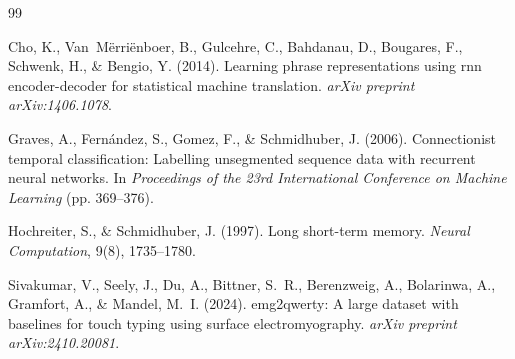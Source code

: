 \documentclass{article}
\begin{document}
{
\small


\begin{thebibliography}{99}

Cho, K., Van~M{\"e}rri{\"e}nboer, B., Gulcehre, C., Bahdanau, D., Bougares, F., Schwenk, H., \& Bengio, Y. (2014).
\newblock Learning phrase representations using rnn encoder-decoder for statistical machine translation.
\newblock \emph{arXiv preprint arXiv:1406.1078}.

Graves, A., Fern{\'a}ndez, S., Gomez, F., \& Schmidhuber, J. (2006).
\newblock Connectionist temporal classification: Labelling unsegmented sequence data with recurrent neural networks.
\newblock In \emph{Proceedings of the 23rd International Conference on Machine Learning} (pp. 369--376).

Hochreiter, S., \& Schmidhuber, J. (1997).
\newblock Long short-term memory.
\newblock \emph{Neural Computation}, 9(8), 1735--1780.

Sivakumar, V., Seely, J., Du, A., Bittner, S.~R., Berenzweig, A., Bolarinwa, A., Gramfort, A., \& Mandel, M.~I. (2024).
\newblock emg2qwerty: A large dataset with baselines for touch typing using surface electromyography.
\newblock \emph{arXiv preprint arXiv:2410.20081}.

\end{thebibliography}
}
\end{document}
